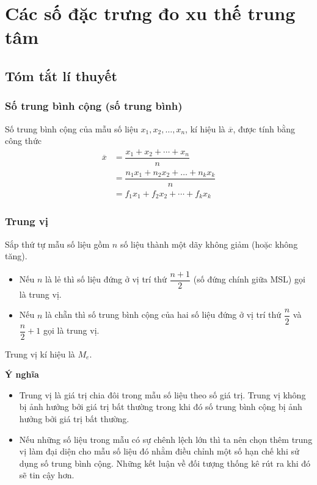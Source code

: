 \setcounter{bt}{0}
\setcounter{vd}{0}
\setcounter{section}{1}
\section{Các số đặc trưng đo xu thế trung tâm}
\subsection{Tóm tắt lí thuyết}
\subsubsection{Số trung bình cộng (số trung bình)}
	\begin{boxdn}
		Số trung bình cộng của mẫu số liệu $x_1,x_2,\ldots,x_n$, kí hiệu là $\overline{x}$, được tính bằng công thức
	\begin{align*}
	\overline{x} & =\dfrac{x_1+x_2+\cdots +x_n}{n}\\
	& =\dfrac{n_1x_1 + n_2x_2 + \ldots + n_kx_k}{n}\\
	& =f_1x_1+f_2x_2+\cdots +f_kx_k		
	\end{align*}
	\end{boxdn}
\subsubsection{Trung vị}
\begin{boxdn}
	Sắp thứ tự mẫu số liệu gồm $n$ số liệu thành một dãy không giảm (hoặc không tăng).
	\begin{itemize}
		\item Nếu $n$ là lẻ thì số liệu đứng ở vị trí thứ $\dfrac{n+1}{2}$ (số đứng chính giữa MSL) gọi là trung vị.
		\item Nếu $n$ là chẵn thì số trung bình cộng của hai số liệu đứng ở vị trí thứ $\dfrac{n}{2}$ và $\dfrac{n}{2}+1$ gọi là trung vị.
	\end{itemize}
	Trung vị kí hiệu là $M_e$.
\end{boxdn}
\textbf{Ý nghĩa}
\begin{itemize}
    \item Trung vị là giá trị chia đôi trong mẫu số liệu theo số giá trị. Trung vị không bị ảnh hưởng bởi giá trị bất thường trong khi đó số trung bình cộng bị ảnh hưởng bởi giá trị bất thường.
    \item Nếu những số liệu trong mẫu có sự chênh lệch lớn thì ta nên chọn thêm trung vị làm đại diện cho mẫu số liệu đó nhằm điều chỉnh một số hạn chế khi sử dụng số trung bình cộng. Những kết luận về đối tượng thống kê rút ra khi đó sẽ tin cậy hơn.
\end{itemize}

